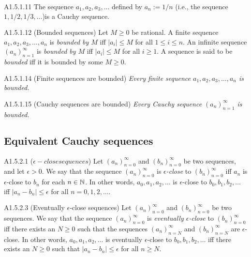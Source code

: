 \begin{proposition}{A1.5.1.11}
    The sequence $a_1, a_2, a_3, \ldots$ defined by $a_n := 1/n$ (i.e., the sequence
    $1, 1/2, 1/3, \ldots$)is a Cauchy sequence.
\end{proposition}

\begin{definition}{A1.5.1.12}
    (Bounded sequences) Let $M \geq 0$ be rational. A finite sequence
    $a_1, a_2, a_3, \ldots, a_n$ is \emph{bounded by $M$} iff $|a_i| \leq M$ for
    all $1 \leq i \leq n$. An infinite sequence $(a_n)_{n=1}^{\infty}$ is \emph{bounded
    by $M$} iff $|a_i| \leq M$ for all $i \geq 1$. A sequence is said to be
    \emph{bounded} iff it is bounded by some $M \geq 0$.
\end{definition}

\begin{lemma}{A1.5.1.14}
    (Finite sequences are bounded) \emph{Every finite sequence $a_1, a_2, a_3, \ldots, a_n$
    is bounded.}
\end{lemma}

\begin{lemma}{A1.5.1.15}
    (Cauchy sequences are bounded) \emph{Every Cauchy sequence $(a_n)_{n=1}^{\infty}$
    is bounded.}
\end{lemma}

\subsection{Equivalent Cauchy sequences}
\begin{definition}{A1.5.2.1}
    ($\epsilon -close sequences$) Let $(a_n)_{n=0}^{\infty}$ and $(b_n)_{n=0}^{\infty}$ be
    two sequences, and let $\epsilon > 0$. We say that the sequence $(a_n)_{n=0}^{\infty}$
    is \emph{$\epsilon$-close} to $(b_n)_{n=0}^{\infty}$ iff $a_n$ is $\epsilon$-close to $b_n$
    for each $n \in \mathbb{N}$. In other words, $a_0, a_1, a_2, \ldots$ is $\epsilon$-close
    to $b_0, b_1, b_2, \ldots$ iff $|a_n - b_n| \leq \epsilon$ for all $n = 0, 1, 2, \ldots$.
\end{definition}

\begin{definition}{A1.5.2.3}
    (Eventually $\epsilon$-close sequences) Let $(a_n)_{n=0}^{\infty}$ and $(b_n)_{n=0}^{\infty}$
    be two sequences. We say that the sequence $(a_n)_{n=0}^{\infty}$ is \emph{eventually
    $\epsilon$-close} to $(b_n)_{n=0}^{\infty}$ iff there exists an $N \geq 0$ such that
    the sequences $(a_n)_{n=N}^{\infty}$ and $(b_n)_{n=N}^{\infty}$ are $\epsilon$-close.
    In other words, $a_0, a_1, a_2, \ldots$ is eventually $\epsilon$-close to $b_0, b_1, b_2, \ldots$
    iff there exists an $N \geq 0$ such that $|a_n - b_n| \leq \epsilon$ for all $n \geq N$.
\end{definition}

